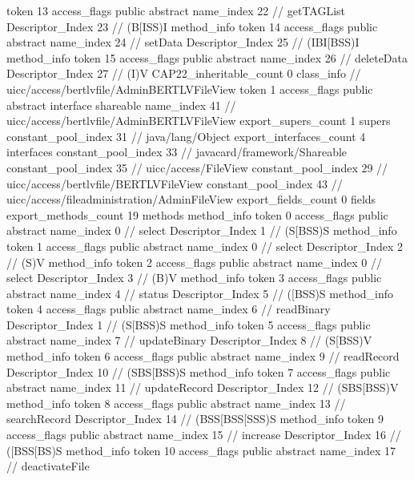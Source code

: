 {{{{{					token	13
					access_flags	public abstract
					name_index	22		// getTAGList
					Descriptor_Index	23		// (B[ISS)I
				}
				method_info {
					token	14
					access_flags	public abstract
					name_index	24		// setData
					Descriptor_Index	25		// (IBI[BSS)I
				}
				method_info {
					token	15
					access_flags	public abstract
					name_index	26		// deleteData
					Descriptor_Index	27		// (I)V
				}
			}
			CAP22_inheritable_count	0
		}
		class_info {		// uicc/access/bertlvfile/AdminBERTLVFileView
			token	1
			access_flags	public abstract interface shareable
			name_index	41		// uicc/access/bertlvfile/AdminBERTLVFileView
			export_supers_count	1
			supers {
				constant_pool_index	31		// java/lang/Object
			}
			export_interfaces_count	4
			interfaces {
				constant_pool_index	33		// javacard/framework/Shareable
				constant_pool_index	35		// uicc/access/FileView
				constant_pool_index	29		// uicc/access/bertlvfile/BERTLVFileView
				constant_pool_index	43		// uicc/access/fileadministration/AdminFileView
			}
			export_fields_count	0
			fields {
			}
			export_methods_count	19
			methods {
				method_info {
					token	0
					access_flags	public abstract
					name_index	0		// select
					Descriptor_Index	1		// (S[BSS)S
				}
				method_info {
					token	1
					access_flags	public abstract
					name_index	0		// select
					Descriptor_Index	2		// (S)V
				}
				method_info {
					token	2
					access_flags	public abstract
					name_index	0		// select
					Descriptor_Index	3		// (B)V
				}
				method_info {
					token	3
					access_flags	public abstract
					name_index	4		// status
					Descriptor_Index	5		// ([BSS)S
				}
				method_info {
					token	4
					access_flags	public abstract
					name_index	6		// readBinary
					Descriptor_Index	1		// (S[BSS)S
				}
				method_info {
					token	5
					access_flags	public abstract
					name_index	7		// updateBinary
					Descriptor_Index	8		// (S[BSS)V
				}
				method_info {
					token	6
					access_flags	public abstract
					name_index	9		// readRecord
					Descriptor_Index	10		// (SBS[BSS)S
				}
				method_info {
					token	7
					access_flags	public abstract
					name_index	11		// updateRecord
					Descriptor_Index	12		// (SBS[BSS)V
				}
				method_info {
					token	8
					access_flags	public abstract
					name_index	13		// searchRecord
					Descriptor_Index	14		// (BSS[BSS[SSS)S
				}
				method_info {
					token	9
					access_flags	public abstract
					name_index	15		// increase
					Descriptor_Index	16		// ([BSS[BS)S
				}
				method_info {
					token	10
					access_flags	public abstract
					name_index	17		// deactivateFile
}}}}}
